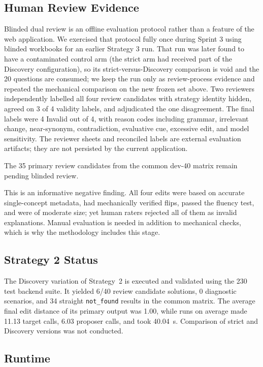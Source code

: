 \documentclass[11pt,a4paper]{article}
\begin{document}
\subsection{Human Review Evidence}
\label{sec:review}

Blinded dual review is an offline evaluation protocol rather than a feature of the web
application. We exercised that protocol fully once during Sprint 3 using blinded
workbooks for an earlier Strategy 3 run. That run was later found to have a
contaminated control arm (the strict arm had received part of the Discovery
configuration), so its strict-versus-Discovery comparison is void and the 20 questions
are consumed; we keep the run only as review-process evidence and repeated the
mechanical comparison on the new frozen set above. Two reviewers independently
labelled all four review candidates with strategy identity hidden, agreed on 3 of 4
validity labels, and adjudicated the one disagreement. The final labels were 4 Invalid
out of 4, with reason codes including grammar, irrelevant change, near-synonym,
contradiction, evaluative cue, excessive edit, and model sensitivity. The reviewer
sheets and reconciled labels are external evaluation artifacts; they are not persisted
by the current application.

The 35 primary review candidates from the common dev-40 matrix remain pending blinded
review.

This is an informative negative finding. All four edits were based on accurate
single-concept metadata, had mechanically verified flips, passed the fluency test,
and were of moderate size; yet human raters rejected all of them as invalid
explanations. Manual evaluation is needed in addition to mechanical checks, which is
why the methodology includes this stage.

\subsection{Strategy 2 Status}

The Discovery variation of Strategy~2 is executed and validated using the 230 test
backend suite. It yielded 6/40 review candidate solutions, 0 diagnostic scenarios, and
34 straight \texttt{not\_found} results in the common matrix. The average final edit
distance of its primary output was 1.00, while runs on average made 11.13 target calls,
6.03 proposer calls, and took 40.04~s. Comparison of strict and Discovery versions was
not conducted.

\subsection{Runtime}
\label{sec:runtime}
\end{document}
